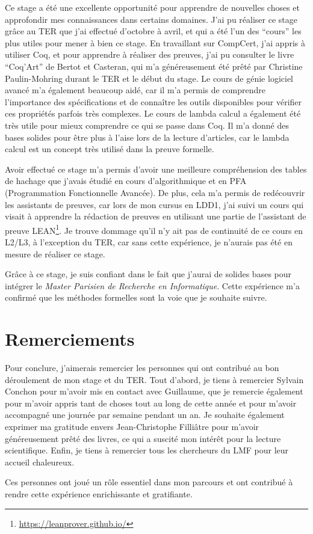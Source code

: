 \documentclass{article}
\begin{document}
  Ce stage a été une excellente opportunité pour apprendre de nouvelles choses
et approfondir mes connaissances dans certains domaines. J'ai pu réaliser ce
stage grâce au TER que j'ai effectué d'octobre à avril, et qui a été l'un des
``cours'' les plus utiles pour mener à bien ce stage. En travaillant sur
CompCert, j'ai appris à utiliser Coq, et pour apprendre à réaliser des preuves,
j'ai pu consulter le livre ``Coq'Art'' de Bertot et Casteran\cite{bertot2015coq},
qui m'a généreusement été prêté par Christine Paulin-Mohring durant le TER et le
début du stage. Le cours de génie logiciel avancé m'a également beaucoup aidé,
car il m'a permis de comprendre l'importance des spécifications et de connaître
les outils disponibles pour vérifier ces propriétés parfois très complexes. Le
cours de lambda calcul a également été très utile pour mieux comprendre ce qui
se passe dans Coq. Il m'a donné des bases solides pour être plus à l'aise lors
de la lecture d'articles, car le lambda calcul est un concept très utilisé dans
la preuve formelle.

  Avoir effectué ce stage m'a permis d'avoir une meilleure compréhension des
tables de hachage que j'avais étudié en cours d'algorithmique et en PFA
(Programmation Fonctionnelle Avancée). De plus, cela m'a permis de redécouvrir
les assistants de preuves, car lors de mon cursus en LDD1, j'ai suivi un cours
qui visait à apprendre la rédaction de preuves en utilisant une partie de
l'assistant de preuve LEAN\footnote{\url{https://leanprover.github.io/}}.
Je trouve dommage qu'il n'y ait pas de continuité de ce cours en L2/L3, à
l'exception du TER, car sans cette expérience, je n'aurais pas été en mesure de
réaliser ce stage.

Grâce à ce stage, je suis confiant dans le fait que j'aurai de solides bases
pour intégrer le \textit{Master Parisien de Recherche en Informatique}. Cette
expérience m'a confirmé que les méthodes formelles sont la voie que
je souhaite suivre.

  \section{Remerciements}

  Pour conclure, j'aimerais remercier les personnes qui ont contribué au bon
déroulement de mon stage et du TER. Tout d'abord, je tiens à remercier Sylvain
Conchon pour m'avoir mis en contact avec Guillaume, que je remercie également
pour m'avoir appris tant de choses tout au long de cette année et pour m'avoir
accompagné une journée par semaine pendant un an. Je souhaite également
exprimer ma gratitude envers Jean-Christophe Filliâtre pour m'avoir
généreusement prêté des livres, ce qui a suscité mon intérêt pour la lecture
scientifique. Enfin, je tiens à remercier tous les chercheurs du LMF pour leur
accueil chaleureux.

  Ces personnes ont joué un rôle essentiel dans mon parcours et ont contribué à
rendre cette expérience enrichissante et gratifiante.

  
  
\end{document}
